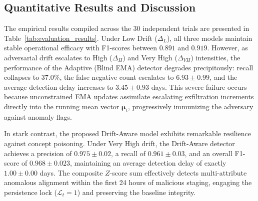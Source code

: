 \documentclass[conference]{IEEEtran}
\begin{document}
\subsection{Quantitative Results and Discussion}
The empirical results compiled across the 30 independent trials are presented in Table~\ref{tab:evaluation_results}. Under Low Drift ($\Delta_L$), all three models maintain stable operational efficacy with F1-scores between $0.891$ and $0.919$. However, as adversarial drift escalates to High ($\Delta_H$) and Very High ($\Delta_{VH}$) intensities, the performance of the Adaptive (Blind EMA) detector degrades precipitously: recall collapses to $37.0\%$, the false negative count escalates to $6.93 \pm 0.99$, and the average detection delay increases to $3.45 \pm 0.93$ days. This severe failure occurs because unconstrained EMA updates assimilate escalating exfiltration increments directly into the running mean vector $\boldsymbol{\mu}_t$, progressively immunizing the adversary against anomaly flags.

In stark contrast, the proposed Drift-Aware model exhibits remarkable resilience against concept poisoning. Under Very High drift, the Drift-Aware detector achieves a precision of $0.975 \pm 0.02$, a recall of $0.961 \pm 0.03$, and an overall F1-score of $0.968 \pm 0.023$, maintaining an average detection delay of exactly $1.00 \pm 0.00$ days. The composite $Z$-score sum effectively detects multi-attribute anomalous alignment within the first 24 hours of malicious staging, engaging the persistence lock ($\mathcal{L}_t = 1$) and preserving the baseline integrity.
\end{document}
